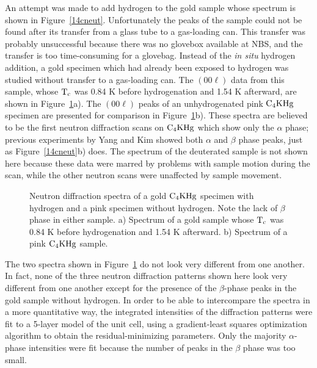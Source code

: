         An  attempt was made   to add   hydrogen to the   gold sample whose
spectrum is shown in Figure~\ref{14cneut}.  Unfortunately the  peaks of the
sample  could   not be found   after its  transfer  from a glass  tube to a
gas-loading can.  This transfer was probably unsuccessful because there was
no glovebox available at NBS, and the  transfer is too time-consuming for a
glovebag.   Instead  of  the {\em  in   situ\/}  hydrogen addition,  a gold
specimen which had  already  been exposed to hydrogen was  studied  without
transfer to a gas-loading can.  The $(00\ell)$ data from this sample, whose
$\rm T_c$ was 0.84 K before  hydrogenation and 1.54 K  afterward, are shown
in Figure~\ref{6bneut}a).  The  $(00\ell)$ peaks  of an unhydrogenated pink
$\rm    C_4KHg$   specimen   are      presented     for   comparison     in
Figure~\ref{6bneut}b).  These spectra are  believed to be the first neutron
diffraction scans on  $\rm  C_4KHg$ which  show only  the   $\alpha$ phase;
previous experiments by Yang\cite{yang84}  and Kim\cite{kim84} showed  both
$\alpha$ and $\beta$ phase peaks, just as Figure~\ref{14cneut}b) does.  The
spectrum of the deuterated sample is not shown here because these data were
marred  by problems with sample motion  during the scan,  while   the other
neutron scans were unaffected by sample movement.

\begin{figure}
\vspace{20cm}
\caption[Neutron diffraction spectra of a gold  $\rm C_4KHg$ specimen with
hydrogen and a pink  sample without hydrogen.]{Neutron  diffraction spectra
of a gold $\rm C_4KHg$ specimen with hydrogen  and a pink  specimen without
hydrogen.  Note the lack of $\beta$ phase in either sample.   a) Spectrum of
a gold sample whose $\rm T_c$ was 0.84  K  before  hydrogenation and 1.54 K
afterward.  b) Spectrum of a pink $\rm C_4KHg$ sample.}
\label{6bneut}
\end{figure}


        The  two  spectra shown  in  Figure~\ref{6bneut}  do not  look very
different from one another.  In fact, none of the three neutron diffraction
patterns shown  here look very  different  from one another except for  the
presence  of the $\beta$-phase peaks  in the  gold sample without hydrogen.
In order to be able to intercompare the spectra in a more quantitative way,
the integrated  intensities of the  diffraction   patterns  were  fit to  a
5-layer model\cite{lagrange83a} of the unit   cell,  using a  gradient-least
squares  optimization  algorithm     to  obtain   the   residual-minimizing
parameters.  Only the majority  $\alpha$-phase intensities were fit because
the number of peaks in the $\beta$ phase was too small.

